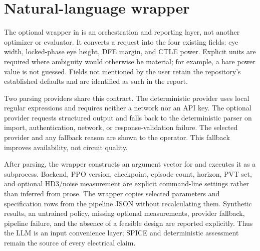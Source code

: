 \section{Natural-language wrapper}

The optional wrapper in  is an orchestration and
reporting layer, not another optimizer or evaluator. It converts a request into
the four existing  fields: eye width, locked-phase eye height,
DFE margin, and CTLE power. Explicit units are required where ambiguity would
otherwise be material; for example, a bare power value is not guessed. Fields
not mentioned by the user retain the repository's established defaults and are
identified as such in the report.

Two parsing providers share this contract. The deterministic 
provider uses local regular expressions and requires neither a network nor an
API key. The optional  provider requests structured output and
falls back to the deterministic parser on import, authentication, network, or
response-validation failure. The selected provider and any fallback reason are
shown to the operator. This fallback improves availability, not circuit quality.

After parsing, the wrapper constructs an argument vector for
 and executes it as a subprocess.
Backend, PPO version, checkpoint, episode count, horizon, PVT set, and optional
HD3/noise measurement are explicit command-line settings rather than inferred
from prose. The wrapper copies selected parameters and specification rows from
the pipeline JSON without recalculating them. Synthetic results, an untrained
policy, missing optional measurements, provider fallback, pipeline failure, and
the absence of a feasible design are reported explicitly. Thus the LLM is an
input convenience layer; SPICE and deterministic assessment remain the source
of every electrical claim.
